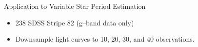 \documentclass[12pt]{beamer}
\begin{document}
\begin{frame}{Application to Variable Star Period Estimation}
\begin{itemize}
\item 238 SDSS Stripe 82 (g--band data only)
\item Downsample light curves to 10, 20, 30, and 40 observations.

\def \tw {.15}
  




\end{itemize}
\end{frame}
\end{document}
